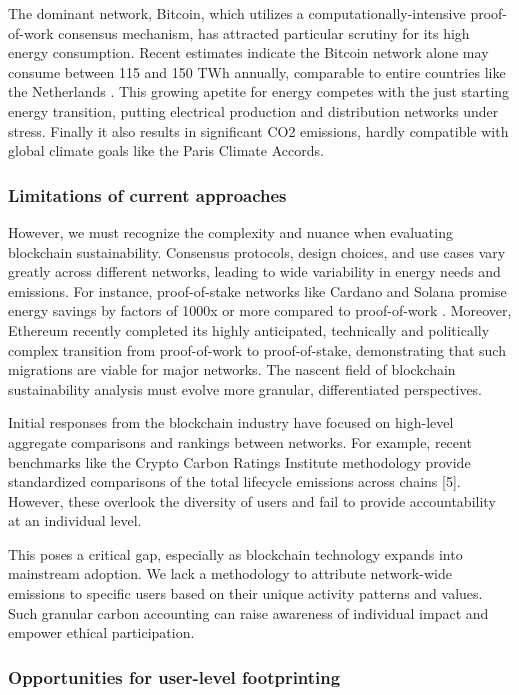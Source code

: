 \documentclass[11pt]{report}
\begin{document}
The dominant network, Bitcoin, which utilizes a computationally-intensive proof-of-work consensus mechanism, has attracted particular scrutiny for its high energy consumption. Recent estimates indicate the Bitcoin network alone may consume between 115 and 150 TWh annually, comparable to entire countries like the Netherlands \cite{devriesRevisitingBitcoinCarbon2022,neumuellerCambridgeBitcoinElectricity2021}. This growing apetite for energy competes with the just starting energy transition, putting electrical production and distribution networks under stress. Finally it also results in significant CO2 emissions, hardly compatible with global climate goals like the Paris Climate Accords.

\subsubsection*{Limitations of current approaches}
However, we must recognize the complexity and nuance when evaluating blockchain sustainability. Consensus protocols, design choices, and use cases vary greatly across different networks, leading to wide variability in energy needs and emissions. For instance, proof-of-stake networks like Cardano and Solana promise energy savings by factors of 1000x or more compared to proof-of-work \cite{kohliAnalysisEnergyConsumption2023}. Moreover, Ethereum recently completed its highly anticipated, technically and politically complex transition from proof-of-work to proof-of-stake, demonstrating that such migrations are viable for major networks. \cite{EthereumMergeYour2022} The nascent field of blockchain sustainability analysis must evolve more granular, differentiated perspectives.

Initial responses from the blockchain industry have focused on high-level aggregate comparisons and rankings between networks. For example, recent benchmarks like the Crypto Carbon Ratings Institute methodology provide standardized comparisons of the total lifecycle emissions across chains [5]. However, these overlook the diversity of users and fail to provide accountability at an individual level.

This poses a critical gap, especially as blockchain technology expands into mainstream adoption. We lack a methodology to attribute network-wide emissions to specific users based on their unique activity patterns and values. Such granular carbon accounting can raise awareness of individual impact and empower ethical participation.

\subsubsection*{Opportunities for user-level footprinting}
\end{document}

